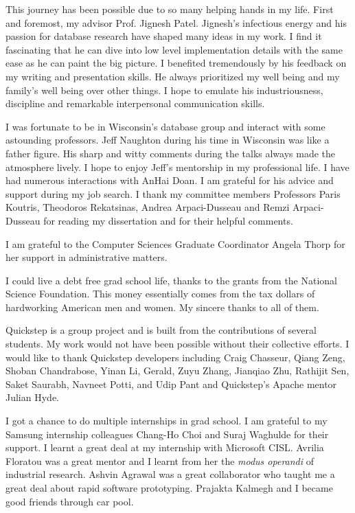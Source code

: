 This journey has been possible due to so many helping hands in my life. 
First and foremost, my advisor Prof. Jignesh Patel. 
Jignesh's infectious energy and his passion for database research have shaped many ideas in my work.
I find it fascinating that he can dive into low level implementation details with the same ease as he can paint the big picture.
I benefited tremendously by his feedback on my writing and presentation skills. 
He always prioritized my well being and my family's well being over other things. 
I hope to emulate his industriousness, discipline and remarkable interpersonal communication skills. 

I was fortunate to be in Wisconsin's database group and interact with some astounding professors. 
Jeff Naughton during his time in Wisconsin was like a father figure. 
His sharp and witty comments during the talks always made the atmosphere lively. 
I hope to enjoy Jeff's mentorship in my professional life. 
I have had numerous interactions with AnHai Doan.
I am grateful for his advice and support during my job search.
I thank my committee members Professors Paris Koutris, Theodoros Rekatsinas, Andrea Arpaci-Dusseau and Remzi Arpaci-Dusseau for reading my dissertation and for their helpful comments. 

I am grateful to the Computer Sciences Graduate Coordinator Angela Thorp for her support in administrative matters. 

I could live a debt free grad school life, thanks to the grants from the National Science Foundation.
This money essentially comes from the tax dollars of hardworking American men and women.
My sincere thanks to all of them.

Quickstep is a group project and is built from the contributions of several students.
My work would not have been possible without their collective efforts. 
I would like to thank Quickstep developers including Craig Chasseur, Qiang Zeng, Shoban Chandrabose, Yinan Li, Gerald, Zuyu Zhang, Jianqiao Zhu, Rathijit Sen, Saket Saurabh, Navneet Potti, and Udip Pant and Quickstep's Apache mentor Julian Hyde.  

I got a chance to do multiple internships in grad school. 
I am grateful to my Samsung internship colleagues Chang-Ho Choi and Suraj Waghulde for their support. 
I learnt a great deal at my internship with Microsoft CISL.
Avrilia Floratou was a great mentor and I learnt from her the \textit{modus operandi} of industrial research.
Ashvin Agrawal was a great collaborator who taught me a great deal about rapid software prototyping. 
Prajakta Kalmegh and I became good friends through car pool. 


